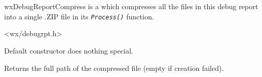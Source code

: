 
\section{}\label{wxdebugreportcompress}

wxDebugReportCompress is a  which
compresses all the files in this debug report into a single .ZIP file in its
\texttt{\textit{Process()}} function.




<wx/debugrpt.h>





\label{wxdebugreportcompresswxdebugreportcompress}


Default constructor does nothing special.

\label{wxdebugreportcompressgetcompressedfilename}


Returns the full path of the compressed file (empty if creation failed).

